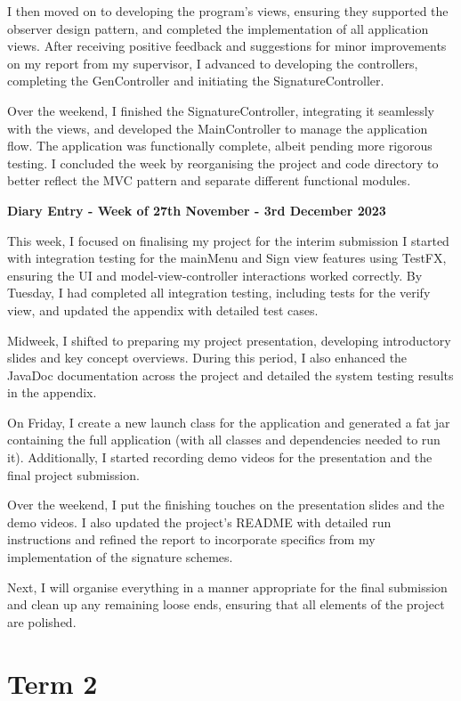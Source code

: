 \documentclass[]{final_report}
\theoremstyle{definition}
\begin{document}
I then moved on to developing the program's views, ensuring they supported the observer design
pattern, and completed the implementation of all application views. After receiving positive
feedback and suggestions for minor improvements on my report from my supervisor, I advanced to
developing the controllers, completing the GenController and initiating the SignatureController.

Over the weekend, I finished the SignatureController, integrating it seamlessly with the views, and
developed the MainController to manage the application flow. The application was functionally
complete, albeit pending more rigorous testing. I concluded the week by reorganising the project and
code directory to better reflect the MVC pattern and separate different functional modules.


\textbf{Diary Entry - Week of 27th November - 3rd December 2023}

This week, I focused on finalising my project for the interim submission I started with integration
testing for the mainMenu and Sign view features using TestFX, ensuring the UI and
model-view-controller interactions worked correctly. By Tuesday, I had completed all integration
testing, including tests for the verify view, and updated the appendix with detailed test cases.

Midweek, I shifted to preparing my project presentation, developing introductory slides and key
concept overviews. During this period, I also enhanced the JavaDoc documentation across the project
and detailed the system testing results in the appendix.

On Friday, I create a new launch class for the application and generated a fat jar containing the
full application (with all classes and dependencies needed to run it). Additionally, I started
recording demo videos for the presentation and the final project submission.

Over the weekend, I put the finishing touches on the presentation slides and the demo videos. I also
updated the project's README with detailed run instructions and refined the report to incorporate
specifics from my implementation of the signature schemes.

Next, I will organise everything in a manner appropriate for the final submission and clean up any
remaining loose ends, ensuring that all elements of the project are polished.

\section{Term 2}
\end{document}
